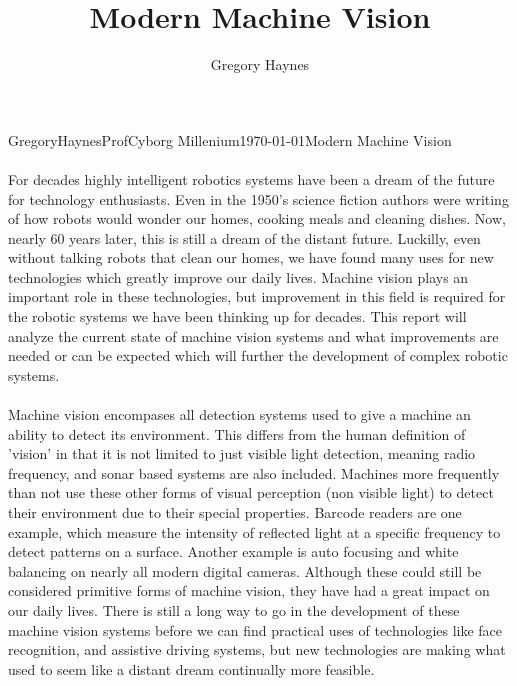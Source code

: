 \documentclass[a4paper,10pt]{article}
\title{Modern Machine Vision}
\author{Gregory Haynes}
\begin{document}
\begin{mla}{Gregory}{Haynes}{Prof}{Cyborg Millenium}{\today}{Modern Machine Vision}

\paragraph{}For decades highly intelligent robotics systems have been a dream of the future for technology enthusiasts.  Even in the 1950's science fiction authors were writing of how robots would wonder our homes, cooking meals and cleaning dishes.  Now, nearly 60 years later, this is still a dream of the distant future.  Luckilly, even without talking robots that clean our homes, we have found many uses for new technologies which greatly improve our daily lives.  Machine vision plays an important role in these technologies, but improvement in this field is required for the robotic systems we have been thinking up for decades.  This report will analyze the current state of machine vision systems and what improvements are needed or can be expected which will further the development of complex robotic systems.

\paragraph{}Machine vision encompases all detection systems used to give a machine an ability to detect its environment.  This differs from the human definition of 'vision' in that it is not limited to just visible light detection, meaning radio frequency, and sonar based systems are also included.  Machines more frequently than not use these other forms of visual perception (non visible light) to detect their environment due to their special properties.  Barcode readers are one example, which measure the intensity of reflected light at a specific frequency to detect patterns on a surface.  Another example is auto focusing and white balancing on nearly all modern digital cameras.  Although these could still be considered primitive forms of machine vision, they have had a great impact on our daily lives.  There is still a long way to go in the development of these machine vision systems before we can find practical uses of technologies like face recognition, and assistive driving systems, but new technologies are making what used to seem like a distant dream continually more feasible.


\end{mla}
\end{document}
